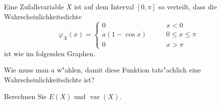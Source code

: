 Eine Zufallsvariable $X$ ist auf dem Interval $[0,\pi]$ so verteilt, dass die
Wahrscheinlichkeitsdichte
\[
\varphi_X(x)=\begin{cases}
0\qquad&x < 0\\
a(1-\cos x)\qquad&0\le x\le\pi\\
0\qquad&x>\pi
\end{cases}
\]
ist wie im folgenden Graphen.
\begin{center}
\end{center}
\begin{teilaufgaben}
\item
Wie muss man $a$ w"ahlen, damit diese Funktion tats"achlich eine
Wahrscheinlichkeitsdichte ist?
\item
Berechnen Sie $E(X)$ und $\operatorname{var}(X)$.
\end{teilaufgaben}


